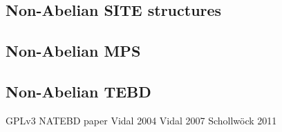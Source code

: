 \documentclass[aps,prb,twocolumn,showpacs,preprintnumbers,amsmath,amssymb, superscriptaddressm, nofootinbib]{revtex4-2}   %
\begin{document}
\subsection{Non-Abelian SITE structures}
\subsection{Non-Abelian MPS}
\subsection{Non-Abelian TEBD}




\begin{thebibliography}{99}
 GPLv3
 NATEBD paper
 Vidal 2004
 Vidal 2007
 Schollwöck 2011 
\end{thebibliography}
\end{document}
